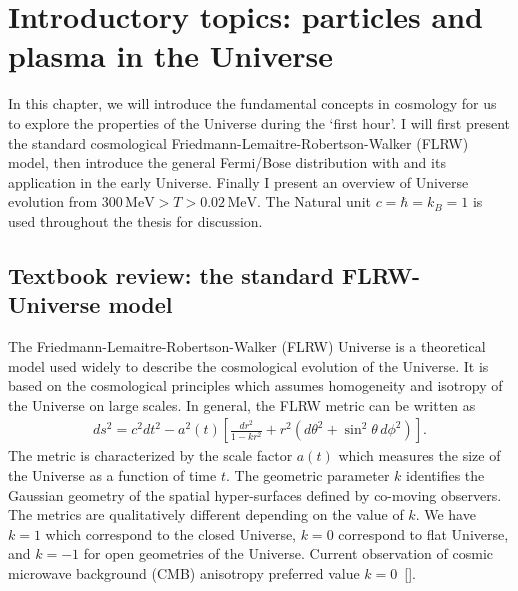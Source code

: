 \chapter{Introductory topics: particles and plasma in the Universe}\label{Introduction}
In this chapter, we will introduce the fundamental concepts in cosmology for us to explore the properties of the Universe during the `first hour'. I will first present the standard cosmological Friedmann-Lemaitre-Robertson-Walker (FLRW) model, then introduce the general Fermi/Bose distribution with and its application in the early Universe. Finally I present an overview of Universe evolution from $300\,\mathrm{MeV}>T>0.02\,\mathrm{MeV}$.
The Natural unit $c=\hbar=k_{B}=1$ is used throughout the thesis for discussion.


\section{Textbook review: the standard FLRW-Universe model}
The Friedmann-Lemaitre-Robertson-Walker (FLRW) Universe is a theoretical model used widely to describe the cosmological evolution of the Universe. It is based on the cosmological principles which assumes homogeneity and isotropy of the Universe on large scales. In general, the FLRW metric can be written as
\begin{align}\label{metric}
ds^2=c^2dt^2-a^2(t)\left[ \frac{dr^2}{1-kr^2}+r^2(d\theta^2+\sin^2\theta\,d\phi^2)\right].
\end{align}
The metric is characterized by the scale factor $a(t)$ which measures the size of the Universe as a function of time $t$. The geometric parameter $k$ identifies the Gaussian geometry of the spatial hyper-surfaces defined by co-moving observers. The metrics are qualitatively different depending on the value of $k$. We have $k=1$ which correspond to the closed Universe,  $k=0$ correspond to flat Universe, and $k=-1$ for open geometries of the Universe. Current observation of cosmic microwave background (CMB) anisotropy preferred value $k=0$~[\cite{Planck:2013pxb,Planck:2015fie,Planck:2018vyg}].


